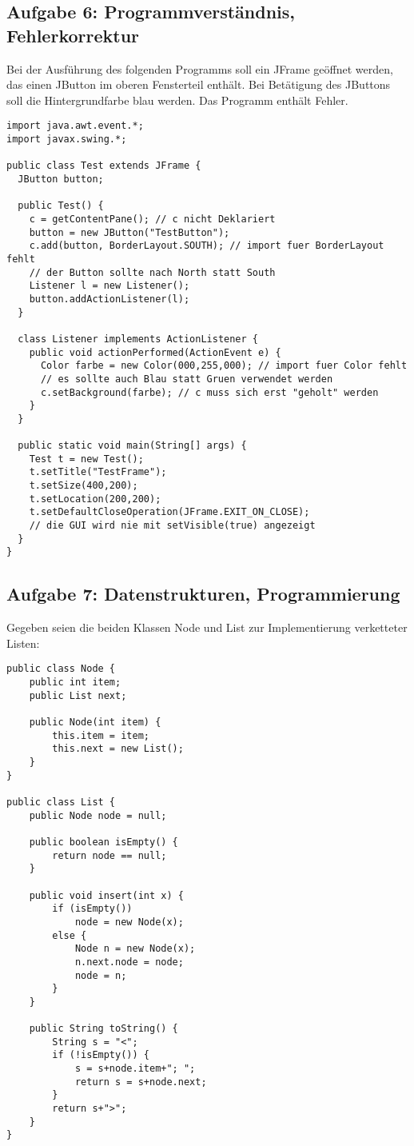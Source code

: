 \documentclass[a4paper, 10pt]{article}
\begin{document}
\subsection*{Aufgabe 6: Programmverständnis, Fehlerkorrektur}
Bei der Ausführung des folgenden
Programms soll ein JFrame geöffnet werden, das einen JButton im oberen Fensterteil enthält.
Bei Betätigung des JButtons soll die Hintergrundfarbe blau werden. Das Programm
enthält Fehler.

\begin{lstlisting}
import java.awt.event.*;
import javax.swing.*;

public class Test extends JFrame {
  JButton button;
  
  public Test() {
    c = getContentPane(); // c nicht Deklariert
    button = new JButton("TestButton");
    c.add(button, BorderLayout.SOUTH); // import fuer BorderLayout fehlt
    // der Button sollte nach North statt South
    Listener l = new Listener();
    button.addActionListener(l);
  }
  
  class Listener implements ActionListener {
    public void actionPerformed(ActionEvent e) {
      Color farbe = new Color(000,255,000); // import fuer Color fehlt
      // es sollte auch Blau statt Gruen verwendet werden
      c.setBackground(farbe); // c muss sich erst "geholt" werden
    }
  }
  
  public static void main(String[] args) {
    Test t = new Test();
    t.setTitle("TestFrame");
    t.setSize(400,200);
    t.setLocation(200,200);
    t.setDefaultCloseOperation(JFrame.EXIT_ON_CLOSE);
    // die GUI wird nie mit setVisible(true) angezeigt
  }
}
\end{lstlisting}

\subsection*{Aufgabe 7: Datenstrukturen, Programmierung}
Gegeben seien die beiden Klassen Node
und List zur Implementierung verketteter Listen:

\begin{lstlisting}
public class Node {
	public int item;
	public List next;
	
	public Node(int item) {
		this.item = item;
		this.next = new List();
	}
}

public class List {
	public Node node = null;
	
	public boolean isEmpty() {
		return node == null;
	}
	
	public void insert(int x) {
		if (isEmpty())
			node = new Node(x);
		else {
			Node n = new Node(x);
			n.next.node = node;
			node = n;
		}
	}
	
	public String toString() {
		String s = "<";
		if (!isEmpty()) {
			s = s+node.item+"; ";
			return s = s+node.next;
		}
		return s+">";
	}
}
\end{lstlisting}
\end{document}
